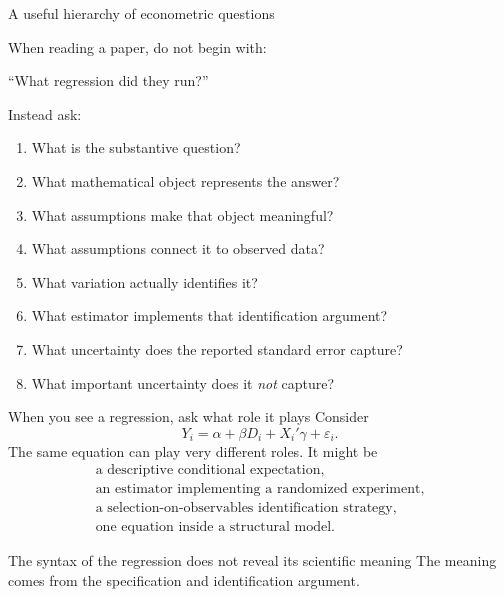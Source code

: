 \documentclass[aspectratio=169,11pt]{beamer}
\begin{document}
\begin{frame}{A useful hierarchy of econometric questions}

When reading a paper, do not begin with:

\begin{center}
``What regression did they run?''
\end{center}

Instead ask:

\vspace{0.25em}

\begin{enumerate}
    \item What is the substantive question?
    \item What mathematical object represents the answer?
    \item What assumptions make that object meaningful?
    \item What assumptions connect it to observed data?
    \item What variation actually identifies it?
    \item What estimator implements that identification argument?
    \item What uncertainty does the reported standard error capture?
    \item What important uncertainty does it \emph{not} capture?
\end{enumerate}

\end{frame}

\begin{frame}{When you see a regression, ask what role it plays}
Consider
\[
Y_i = \alpha+\beta D_i+X_i'\gamma+\varepsilon_i.
\]
The same equation can play very different roles. It might be
\[
\begin{array}{c}
\boxed{\text{a descriptive conditional expectation}},\\[0.3em]
\boxed{\text{an estimator implementing a randomized experiment}},\\[0.3em]
\boxed{\text{a selection-on-observables identification strategy}},\\[0.3em]
\boxed{\text{one equation inside a structural model}}.
\end{array}
\]

\begin{alertblock}{The syntax of the regression does not reveal its scientific meaning}
The meaning comes from the specification and identification argument.
\end{alertblock}
\end{frame}
\end{document}
